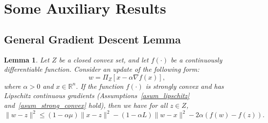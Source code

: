 \documentclass{article}
\def\A{\mathscr{A}}
\def\a{\alpha}
\def\re{\mathbb{R}}
\def\dist{{\rm dist}}
\newcommand{\Ex}{\mathbb{E}}
\newcommand{\colr}[1]{\textcolor{red}{#1}} %
\theoremstyle{plain}
\newtheorem{lemma}[theorem]{Lemma}
\theoremstyle{definition}
\theoremstyle{remark}
\begin{document}




\section{Some Auxiliary Results}

\subsection{General Gradient Descent Lemma}

\begin{lemma}\label{lem-elem-grad} 
     Let $Z$ be a closed convex set, and let 
     $f(\cdot)$ be a continuously differentiable function. Consider an update of the following form:
     \[w=\Pi_Z[x-\a\nabla f(x)],\]
     where $\a>0$ and $x\in\re^n$. If the function $f(\cdot)$ is strongly convex and has Lipschitz continuous gradients (Assumptions~\ref{asum_lipschitz} and~\ref{asum_strong_convex} hold), then 
     we have for all $z\in Z$,
     \[\|w - z\|^2 \leq (1-\a \mu) \| x -z \|^2 - (1 - \a L) \| w - x\|^2 - 2 \a (f(w) - f(z)).\]
     \end{lemma}
\end{document}

